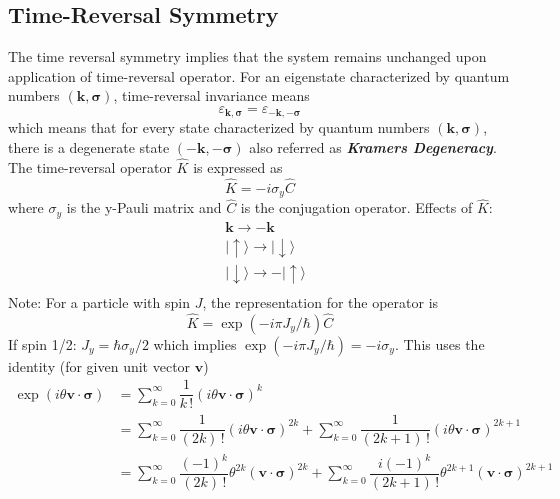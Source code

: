 \documentclass[aps,prb,onecolumn,notitlepage,showpacs,floatfix,superscriptaddress]{revtex4-1}
\begin{document}
\subsection{Time-Reversal Symmetry}
The time reversal symmetry implies that the system remains unchanged upon application of time-reversal operator. For an eigenstate characterized by quantum numbers $({\bm k},{\bm \sigma})$, time-reversal invariance means
\begin{equation}
\varepsilon_{{\bm k},{\bm \sigma}}=\varepsilon_{-{\bm k},-{\bm \sigma}}
\end{equation}
which means that for every state characterized by quantum numbers $({\bm k},{\bm \sigma})$, there is a degenerate state $(-{\bm k},-{\bm \sigma})$ also referred as \textbf{\textit{Kramers Degeneracy}}. The time-reversal operator $\hat{K}$ is expressed as
\begin{equation}
\hat{K}=-i\sigma_y \hat{C}
\end{equation}
where $\sigma_y$ is the y-Pauli matrix and $\hat{C}$ is the conjugation operator. Effects of $\hat{K}$:
\begin{equation}
\begin{split}
&{\bm k} \rightarrow -{\bm k} \\
&\vert \uparrow \rangle \rightarrow \vert \downarrow \rangle \\
&\vert \downarrow \rangle \rightarrow - \vert \uparrow \rangle \\
\end{split}
\end{equation}
Note: For a particle with spin $J$, the representation for the operator is 
\begin{equation}
\hat{K}=\exp\left( -i\pi J_y /\hbar\right) \hat{C}
\end{equation}
If spin 1/2: $J_y=\hbar \sigma_y/2$ which implies $\exp\left( -i\pi J_y /\hbar\right)=-i\sigma_y$. This uses the identity (for given unit vector ${\bm v}$)
\begin{equation}
\begin{split}
\exp\left( i \theta {\bm v}\cdot{\bm \sigma}\right) &= \sum_{k=0}^{\infty} \dfrac{1}{k\, !} \left( i \theta {\bm v}\cdot{\bm \sigma}\right)^k \\
&=\sum_{k=0}^{\infty} \dfrac{1}{(2k)\, !} \left( i \theta {\bm v}\cdot{\bm \sigma}\right)^{2k} +\sum_{k=0}^{\infty} \dfrac{1}{(2k+1)\, !} \left( i \theta {\bm v}\cdot{\bm \sigma}\right)^{2k+1} \\
&=\sum_{k=0}^{\infty} \dfrac{(-1)^k}{(2k)\, !} \theta^{2k} \left(  {\bm v}\cdot{\bm \sigma}\right)^{2k} +\sum_{k=0}^{\infty} \dfrac{i(-1)^k}{(2k+1)\, !} \theta^{2k+1} \left(  {\bm v}\cdot{\bm \sigma}\right)^{2k+1}
\end{split}
\end{equation}
\end{document}
